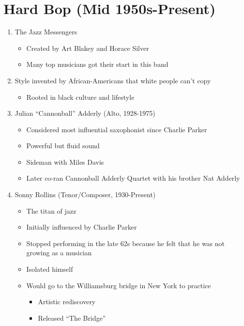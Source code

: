 \documentclass[]{article}
\providecommand{\tightlist}{%
  \setlength{\itemsep}{0pt}\setlength{\parskip}{0pt}}
\begin{document}
\section{Hard Bop (Mid 1950s-Present)}\label{hard-bop-mid-1950s-present}

\begin{enumerate}
\def\labelenumi{\arabic{enumi}.}
\tightlist
\item
  The Jazz Messengers

  \begin{itemize}
  \tightlist
  \item
    Created by Art Blakey and Horace Silver
  \item
    Many top musicians got their start in this band
  \end{itemize}
\item
  Style invented by African-Americans that white people can't copy

  \begin{itemize}
  \tightlist
  \item
    Rooted in black culture and lifestyle
  \end{itemize}
\item
  Julian ``Cannonball'' Adderly (Alto, 1928-1975)

  \begin{itemize}
  \tightlist
  \item
    Considered most influential saxophonist since Charlie Parker
  \item
    Powerful but fluid sound
  \item
    Sideman with Miles Davis
  \item
    Later co-ran Cannonball Adderly Quartet with his brother Nat Adderly
  \end{itemize}
\item
  Sonny Rollins (Tenor/Composer, 1930-Present)

  \begin{itemize}
  \tightlist
  \item
    The titan of jazz
  \item
    Initially influenced by Charlie Parker
  \item
    Stopped performing in the late 62s because he felt that he was not
    growing as a musician
  \item
    Isolated himself
  \item
    Would go to the Williamsburg bridge in New York to practice

    \begin{itemize}
    \tightlist
    \item
      Artistic rediscovery
    \item
      Released ``The Bridge''


\end{itemize}
\end{itemize}
\end{enumerate}
\end{document}
